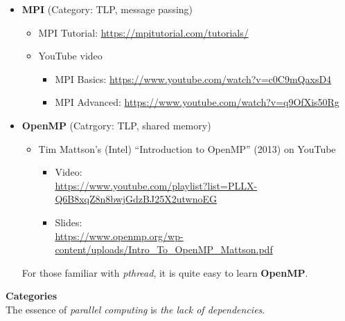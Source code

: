 \documentclass{article}
\begin{document}
\begin{itemize}
\begin{itemize}
    \end{itemize}
    \item \textbf{MPI} (Category: TLP, message passing)
    \begin{itemize}
        \item MPI Tutorial:
        \href{https://mpitutorial.com/tutorials/}{https://mpitutorial.com/tutorials/}
        \item YouTube video
        \begin{itemize}
            \item MPI Basics:
            \href{https://www.youtube.com/watch?v=c0C9mQaxsD4}{https://www.youtube.com/watch?v=c0C9mQaxsD4}
            \item MPI Advanced:
            \href{https://www.youtube.com/watch?v=q9OfXis50Rg}{https://www.youtube.com/watch?v=q9OfXis50Rg}
        \end{itemize}
    \end{itemize}
    \item \textbf{OpenMP} (Catrgory: TLP, shared memory)
    \begin{itemize}
        \item Tim Mattson’s (Intel) “Introduction to OpenMP” (2013) on YouTube
        \begin{itemize}
            \item Video:\\
            \href{https://www.youtube.com/playlist?list=PLLX-Q6B8xqZ8n8bwjGdzBJ25X2utwnoEG}{https://www.youtube.com/playlist?list=PLLX-Q6B8xqZ8n8bwjGdzBJ25X2utwnoEG}
            \item Slides:\\
            \href{https://www.openmp.org/wp-content/uploads/Intro\_To\_OpenMP\_Mattson.pdf}{https://www.openmp.org/wp-content/uploads/Intro\_To\_OpenMP\_Mattson.pdf}
        \end{itemize}
    \end{itemize}
    For those familiar with \emph{pthread}, it is quite easy to learn \textbf{OpenMP}.
\end{itemize}
\textbf{Categories}\\
The essence of \emph{parallel computing} is \emph{the lack of dependencies}.
\end{document}
